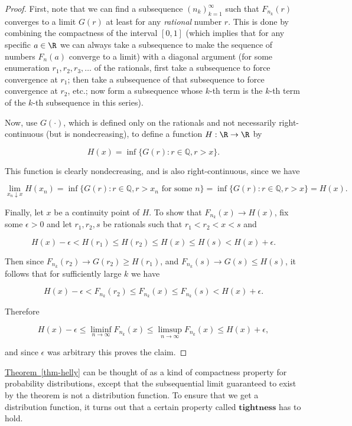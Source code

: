 \begin{proof}
First, note that we can find a subsequence
$(n_k)_{k=1}^\infty$ such that $F_{n_k}(r)$ converges
to a limit $G(r)$ at least for any \emph{rational} number
$r$. This is done by combining the compactness of the
interval $[0,1]$ (which implies that for any specific
$a\in\R$ we can always take a subsequence to make the
sequence of numbers $F_n(a)$ converge to a limit)
with a diagonal argument (for some enumeration
$r_1, r_2, r_3, \ldots$ of the rationals, first take
a subsequence to force convergence at $r_1$; then
take a subsequence of that subsequence to force
convergence at $r_2$, etc.; now form a subsequence
whose $k$-th term is the $k$-th term of the $k$-th
subsequence in this series).

Now, use $G(\cdot)$, which is defined only on the
rationals and not necessarily right-continuous (but is
nondecreasing), to define a function $H:\R \to \R$ by

\[
H(x) = \inf\{ G(r) : r\in\mathbb{Q}, r>x \}.
\]

\noindent This function is clearly nondecreasing, and is also
right-continuous, since we have

\[
\lim_{x_n \downarrow x} H(x_n) = \inf\{ G(r) : r\in\mathbb{Q}, r>x_n\textrm{ for some }n \}
= \inf\{ G(r) : r\in\mathbb{Q}, r>x \} = H(x).
\]

\noindent Finally, let $x$ be a continuity point of $H$. To
show that $F_{n_k}(x)\to H(x)$, fix some $\epsilon>0$
and let $r_1,r_2,s$ be rationals such that
$r_1 < r_2 < x < s$ and

\[
H(x)-\epsilon < H(r_1) \le H(r_2) \le H(x) \le H(s) < H(x)+\epsilon.
\]

\noindent Then since $F_{n_k}(r_2)\to G(r_2)\ge H(r_1)$, and
$F_{n_k}(s)\to G(s)\le H(s)$, it follows that for
sufficiently large $k$ we have

\[
H(x)-\epsilon < F_{n_k}(r_2) \le F_{n_k}(x) \le F_{n_k}(s) < H(x)+\epsilon.
\]

\noindent Therefore

\[
H(x)-\epsilon \le \liminf_{n\to\infty} F_{n_k}(x) \le \limsup_{n\to\infty} F_{n_k}(x) \le H(x)+\epsilon,
\]

\noindent and since $\epsilon$ was arbitrary this proves the
claim.
\end{proof}

\noindent \hyperref[thm-helly]{Theorem~\ref*{thm-helly}} can be thought of as a kind of
compactness property for probability distributions,
except that the subsequential limit guaranteed to
exist by the theorem is not a distribution function.
To ensure that we get a distribution function, it
turns out that a certain property called
$\textbf{tightness}$ has to hold.

